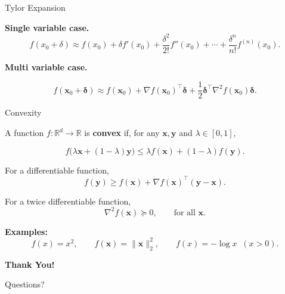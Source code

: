 \documentclass[aspectratio=169,12pt]{beamer}
\begin{document}
\begin{frame}[t]{Tylor Expansion}
	
	\textbf{Single variable case.}
	\[
	f(x_0+\delta)
	\approx
	f(x_0)
	+\delta f'(x_0)
	+\frac{\delta^2}{2!}f''(x_0)
	+\cdots
	+\frac{\delta^n}{n!}f^{(n)}(x_0).
	\]
	
	\textbf{Multi variable case.}
	
	\[
	f(\mathbf{x}_0+\boldsymbol{\delta})
	\approx
	f(\mathbf{x}_0)
	+
	\nabla f(\mathbf{x}_0)^\top \boldsymbol{\delta}
	+
	\frac{1}{2}
	\boldsymbol{\delta}^\top
	\nabla^2 f(\mathbf{x}_0)
	\boldsymbol{\delta}.
	\]
\end{frame}


\begin{frame}[t]{Convexity}
	
	A function $f:\mathbb{R}^d \rightarrow \mathbb{R}$ is \textbf{convex} if, for any
	$\mathbf{x},\mathbf{y}$ and $\lambda \in [0,1]$,
	
	\[
	f\bigl(\lambda \mathbf{x} + (1-\lambda)\mathbf{y}\bigr)
	\leq
	\lambda f(\mathbf{x})
	+
	(1-\lambda)f(\mathbf{y}).
	\]
	
	\vspace{0.25cm}
	
	For a differentiable function,
	\[
	f(\mathbf{y})
	\geq
	f(\mathbf{x})
	+
	\nabla f(\mathbf{x})^\top(\mathbf{y}-\mathbf{x}).
	\]
	
	\vspace{0.25cm}
	
	For a twice differentiable function,
	\[
	\nabla^2 f(\mathbf{x}) \succeq 0,
	\qquad
	\text{for all } \mathbf{x}.
	\]
	
	\vspace{0.3cm}
	
	\textbf{Examples:}
	\[
	f(x)=x^2,
	\qquad
	f(\mathbf{x})=\|\mathbf{x}\|_2^2,
	\qquad
	f(x)=-\log x \;\;(x>0).
	\]
	
\end{frame}
\begin{frame}
  \centering
  \vfill
  {\color{slideorange}\fontsize{31}{37}\selectfont\bfseries Thank You!\par}
  \vspace{0.55cm}
  {\fontsize{25}{30}\selectfont Questions?\par}
  \vfill
\end{frame}
\end{document}
